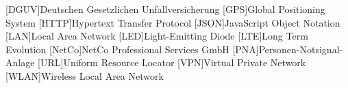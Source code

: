 \documentclass[thesis.tex]{subfiles}
\begin{document}

\begin{acronym}

    [DGUV]{Deutschen Gesetzlichen Unfallversicherung}
    [GPS]{Global Positioning System}
    [HTTP]{Hypertext Transfer Protocol}
    [JSON]{JavaScript Object Notation}
    [LAN]{Local Area Network}
    [LED]{Light-Emitting Diode}
    [LTE]{Long Term Evolution}
    [NetCo]{NetCo Professional Services GmbH}
    [PNA]{Personen-Notsignal-Anlage}
    [URL]{Uniform Resource Locator}
    [VPN]{Virtual Private Network}
    [WLAN]{Wireless Local Area Network}

\end{acronym}

\subfilebib %
\end{document}
